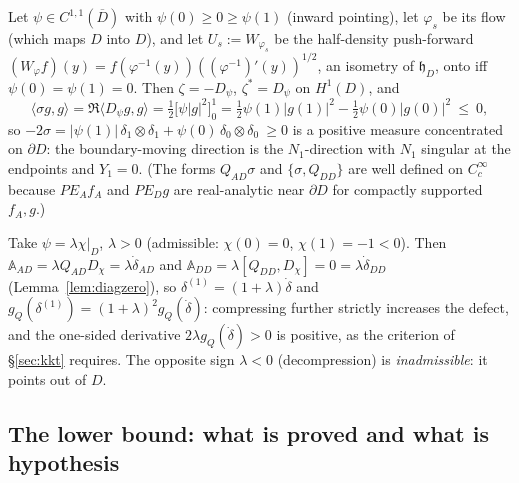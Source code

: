 \documentclass[11pt]{article}
\newcommand{\hh}{\mathfrak h}
\newcommand{\Aop}{\mathbb A}
\begin{document}
\begin{remark}\label{ex:bdry}
Let $\psi\in C^{1,1}(\overline D)$ with $\psi(0)\ge0\ge\psi(1)$ (inward pointing), let
$\varphi_s$ be its flow (which maps $D$ into $D$), and let $U_s:=W_{\varphi_s}$ be the
half-density push-forward $(W_\varphi f)(y)=f(\varphi^{-1}(y))((\varphi^{-1})'(y))^{1/2}$, an isometry of $\hh_D$, onto iff
$\psi(0)=\psi(1)=0$.  Then $\zeta=-D_\psi$, $\zeta^*=D_\psi$ on $H^1(D)$, and
\begin{equation}\label{eq:sigmabd}
 \langle\sigma g,g\rangle=\Re\langle D_\psi g,g\rangle=\tfrac12\bigl[\psi|g|^2\bigr]_0^1
  =\tfrac12\psi(1)|g(1)|^2-\tfrac12\psi(0)|g(0)|^2\ \le\ 0,
\end{equation}
so $-2\sigma=|\psi(1)|\,\delta_1\otimes\delta_1+\psi(0)\,\delta_0\otimes\delta_0\ \ge0$ is a
positive measure concentrated on $\partial D$: the boundary-moving direction is the
$N_1$-direction with $N_1$ singular at the endpoints and $Y_1=0$.  (The forms
$Q_{AD}\sigma$ and $\{\sigma,Q_{DD}\}$ are well defined on $C_c^\infty$ because
$PE_Af_A$ and $PE_Dg$ are real-analytic near $\partial D$ for compactly supported
$f_A,g$.)
\end{remark}

\begin{remark}\label{rem:overcomp}
Take $\psi=\lambda\chi|_D$, $\lambda>0$ (admissible: $\chi(0)=0$, $\chi(1)=-1<0$).  Then
$\Aop_{AD}=\lambda Q_{AD}D_\chi=\lambda\dot\delta_{AD}$ and
$\Aop_{DD}=\lambda[Q_{DD},D_\chi]=0=\lambda\dot\delta_{DD}$ (Lemma~\ref{lem:diagzero}), so
$\delta^{(1)}=(1+\lambda)\dot\delta$ and $g_Q(\delta^{(1)})=(1+\lambda)^2g_Q(\dot\delta)$:
compressing further strictly increases the defect, and the one-sided derivative
$2\lambda g_Q(\dot\delta)>0$ is positive, as the criterion of \S\ref{sec:kkt} requires.
The opposite sign $\lambda<0$ (decompression) is \emph{inadmissible}: it points out of $D$.
\end{remark}


\subsection{The lower bound: what is proved and what is hypothesis}\label{sec:lower}
\end{document}
